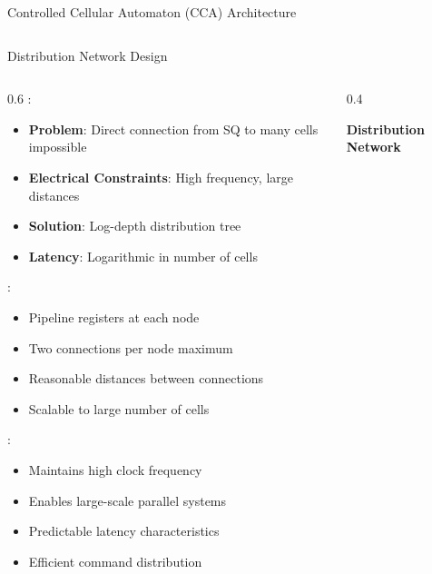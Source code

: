 \begin{frame}{Controlled Cellular Automaton (CCA) Architecture}
\begin{columns}
\end{columns}
\end{frame}

\begin{frame}{Distribution Network Design}
\begin{columns}
\begin{column}{0.6\textwidth}
:
\begin{itemize}
\item \textbf{Problem}: Direct connection from SQ to many cells impossible
\item \textbf{Electrical Constraints}: High frequency, large distances
\item \textbf{Solution}: Log-depth distribution tree
\item \textbf{Latency}: Logarithmic in number of cells
\end{itemize}

\vspace{0.3cm}
:
\begin{itemize}
\item Pipeline registers at each node
\item Two connections per node maximum
\item Reasonable distances between connections
\item Scalable to large number of cells
\end{itemize}

\vspace{0.3cm}
:
\begin{itemize}
\item Maintains high clock frequency
\item Enables large-scale parallel systems
\item Predictable latency characteristics
\item Efficient command distribution
\end{itemize}
\end{column}
\begin{column}{0.4\textwidth}
\begin{center}
\textbf{Distribution Network}
\vspace{0.3cm}


\end{center}
\end{column}
\end{columns}
\end{frame}
